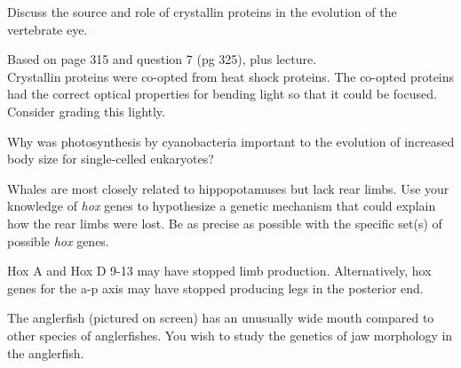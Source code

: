 
\question{}

\question[5]
Discuss the source and role of crystallin proteins in the evolution of the vertebrate eye.
	\begin{solution}
	Based on page 315 and question 7 (pg 325), plus lecture.\\
	Crystallin proteins were co-opted from heat shock proteins. The co-opted proteins had the correct optical properties for bending light so that it could be focused.\\
	Consider grading this lightly.
	\end{solution}


\question[5]
Why was photosynthesis by cyanobacteria important to the evolution of increased body size for single-celled eukaryotes?



\question[10]
Whales are most closely related to hippopotamuses but lack rear limbs.  Use your knowledge of \emph{hox} genes to hypothesize a genetic mechanism that could explain how the rear limbs were lost. Be as precise as possible with the specific set(s) of possible \emph{hox} genes.
	\begin{solution}
	Hox A and Hox D 9-13 may have stopped limb production. Alternatively, hox genes for the a-p axis may have stopped producing legs in the posterior end.
	\end{solution}


\question[8]
The anglerfish (pictured on screen) has an unusually wide mouth compared to other species of anglerfishes. You wish to study the genetics of jaw morphology in the anglerfish.  

